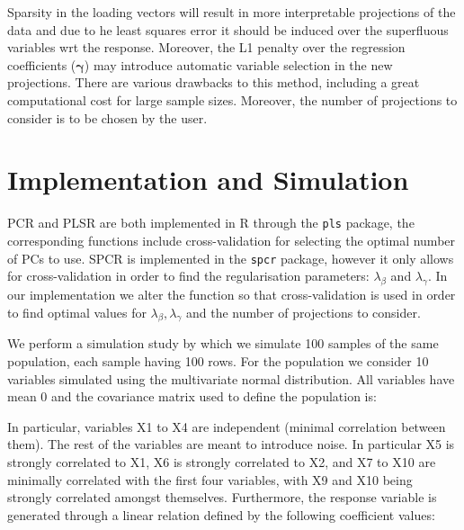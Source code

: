 \documentclass{article}
\newcommand{\code}[1]{\texttt{#1}}
\begin{document}
Sparsity in the loading vectors will result in more interpretable projections of the data and due to he least squares error it should be induced over the superfluous variables wrt the response. Moreover, the L1 penalty over the regression coefficients ($\boldsymbol{\gamma}$) may introduce automatic variable selection in the new projections. There are various drawbacks to this method, including a great computational cost for large sample sizes. Moreover, the number of projections to consider is to be chosen by the user.

\section{Implementation and Simulation}
PCR and PLSR are both implemented in R through the \code{pls} package, the corresponding functions include cross-validation for selecting the optimal number of PCs to use. SPCR is implemented in the \code{spcr} package, however it only allows for cross-validation in order to find the regularisation parameters: $\lambda_{\beta}$ and $\lambda_{\gamma}$. In our implementation we alter the function so that cross-validation is used in order to find optimal values for $\lambda_{\beta}, \lambda_{\gamma}$ and the number of projections to consider.

We perform a simulation study by which we simulate 100 samples of the same population, each sample having 100 rows. For the population we consider 10 variables simulated using the multivariate normal distribution. All variables have mean 0 and the covariance matrix used to define the population is:

\begin{table}[htbp]
    \centering
    \caption{Matrix of Covariances}
\end{table}

In particular, variables X1 to X4 are independent (minimal correlation between them). The rest of the variables are meant to introduce noise. In particular X5 is strongly correlated to X1, X6 is strongly correlated to X2, and X7 to X10 are minimally correlated with the first four variables, with X9 and X10 being strongly correlated amongst themselves. Furthermore, the response variable is generated through a linear relation defined by the following coefficient values:

\begin{table}[htbp]
    \centering
    \caption{True coefficient values}
\end{table}
\end{document}
